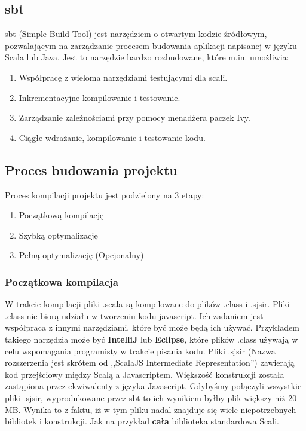\subsection{sbt}
	

sbt (Simple Build Tool) jest narzędziem o otwartym kodzie źródłowym, pozwalającym na zarządzanie procesem budowania aplikacji napisanej w języku Scala lub Java. Jest to narzędzie bardzo rozbudowane, które m.in. umożliwia:
\begin{enumerate}
	\item Współpracę z wieloma narzędziami testującymi dla scali.
	\item Inkrementacyjne kompilowanie i testowanie.
	\item Zarządzanie zależnościami przy pomocy menadżera paczek Ivy.\cite{ApacheIvy}
	\item Ciągłe wdrażanie, kompilowanie i testowanie kodu.
\end{enumerate}




\subsection{Proces budowania projektu}

Proces kompilacji projektu jest podzielony na 3 etapy\cite{HandsOnScalaPipeline}:
\begin{enumerate}
	\item Początkową kompilację
	\item Szybką optymalizację
	\item Pełną optymalizację (Opcjonalny)
\end{enumerate}

\subsubsection{Początkowa kompilacja}

W trakcie kompilacji pliki .scala są kompilowane do plików .class i .sjsir. 
Pliki .class nie biorą udziału w tworzeniu kodu javascript. Ich zadaniem jest współpraca z innymi narzędziami, które być może będą ich używać. Przykładem takiego narzędzia może być \textbf{IntelliJ} lub \textbf{Eclipse}, które plików .class używają w celu wspomagania programisty w trakcie pisania kodu.
Pliki .sjsir (Nazwa rozszerzenia jest skrótem od ,,ScalaJS Intermediate Representation'')\cite{ScalaCompilationProcess} zawierają kod przejściowy między Scalą a Javascriptem. Większość konstrukcji została zastąpiona przez ekwiwalenty z języka Javascript. 
Gdybyśmy połączyli wszystkie pliki .sjsir, wyprodukowane przez sbt to ich wynikiem byłby plik większy niż 20 MB. Wynika to z faktu, iż w tym pliku nadal znajduje się wiele niepotrzebnych bibliotek i konstrukcji. Jak na przykład \textbf{cała} biblioteka standardowa Scali.

